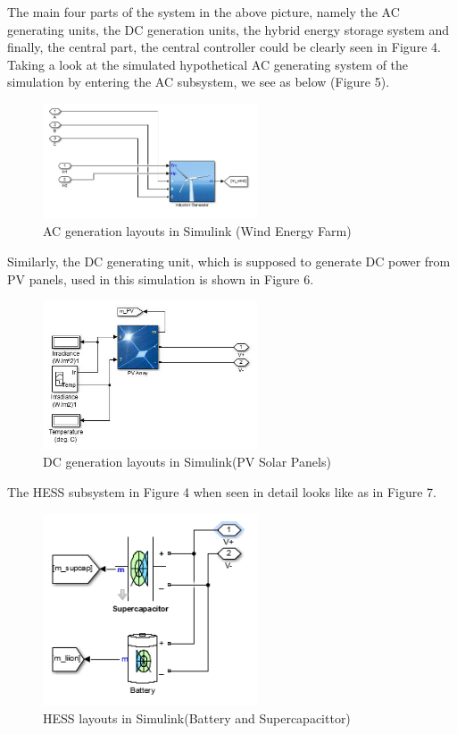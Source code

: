 \documentclass[journal,twoside]{IEEEtran}
\begin{document}
The main four parts of the system in the above
picture, namely the AC generating units, the DC
generation units, the hybrid energy storage system and
finally, the central part, the central controller could be
clearly seen in Figure 4.
Taking a look at the simulated hypothetical
AC generating system of the simulation by entering the
AC subsystem, we see as below (Figure 5).

\begin{figure}[!ht]
\centering
\includegraphics[width=2.5in]{5}
\caption{AC generation layouts in Simulink (Wind Energy Farm)}
\label{f5}
\end{figure}


Similarly, the DC generating unit, which is
supposed to generate DC power from PV panels, used
in this simulation is shown in Figure 6.
\begin{figure}[!ht]
\centering
\includegraphics[width=2.5in]{6}
\caption{DC generation layouts in
Simulink(PV Solar Panels)}
\label{f6}
\end{figure}

The HESS subsystem in Figure 4 when seen
in detail looks like as in Figure 7.
\begin{figure}[!ht]
\centering
\includegraphics[width=2.5in]{7}
\caption{HESS layouts in Simulink(Battery and Supercapacittor)}
\label{f7}
\end{figure}
\end{document}

